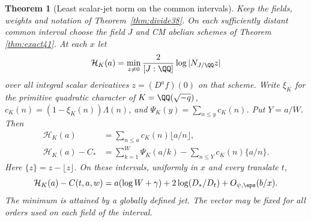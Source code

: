 \documentclass[a4paper,11pt]{article}
\newtheorem{theorem}[proposition]{Theorem}
\theoremstyle{definition}
\theoremstyle{remark}
\numberwithin{equation}{section}
\begin{document}
\begin{theorem}[Least scalar-jet norm on the common intervals]\label{thm:height42}
Keep the fields, weights and notation of Theorem~\ref{thm:divide38}. On each sufficiently distant common interval choose the field \(J\) and CM abelian schemes of Theorem \ref{thm:exact41}. At each \(x\) let
\[
  \mathcal H_K(a)=\min_{z\ne0}\frac{2}{[J:\QQ]}\log|N_{J/\QQ}z|
\]
over all integral scalar derivatives \(z=(D^a f)(0)\) on that scheme. Write \(\xi_K\) for the primitive quadratic character of \(K=\QQ(\sqrt{-q})\), \(c_K(n)=(1-\xi_K(n))\Lambda(n)\), and \(\Psi_K(y)=\sum_{n\le y}c_K(n)\). Put \(Y=a/W\). Then
\begin{align}
 \mathcal H_K(a)&=\sum_{n\le a}c_K(n)\lfloor a/n\rfloor,             \label{eq:height42}\\
 \mathcal H_K(a)-C_*&=\sum_{k=1}^W\Psi_K(a/k)
                 -\sum_{n\le Y}c_K(n)\{a/n\}.                       \label{eq:harm42}
\end{align}
Here \(\{z\}=z-\lfloor z\rfloor\). On these intervals, uniformly in \(x\) and every translate \(t\),
\begin{equation}
 \mathcal H_K(a)-C(t,a,w)
     =a(\log W+\gamma)+2\log(D_*/D_t)+O_{\psi,\eps}(b/x).
                                                                    \label{eq:minper42}
\end{equation}
The minimum is attained by a globally defined jet. The vector may be fixed for all orders used on each field of the interval.
\end{theorem}
\end{document}

